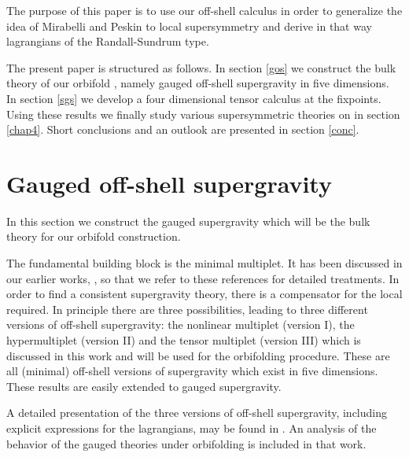 \documentclass[a4paper,12pt, twoside]{article}
\numberwithin{equation}{section}
\begin{document}
The purpose of this paper is to use our off-shell calculus in order to 
generalize the idea of Mirabelli and Peskin to local supersymmetry and 
derive in that way lagrangians of the Randall-Sundrum type.

\medskip

The present paper is structured as follows. In section \ref{gos} we 
construct the bulk theory of our orbifold \coordHE{}, namely 
gauged \coordHE{} off-shell supergravity in five dimensions.
In section \ref{sgs} we develop a four dimensional \coordHE{} tensor 
calculus at the fixpoints. Using these results we finally study various 
supersymmetric theories on \coordHE{} in section \ref{chap4}. Short 
conclusions and an outlook are presented in section \ref{conc}.

\section{Gauged off-shell supergravity\label{gos}}
In this section we construct the gauged supergravity which will be the 
bulk theory for our orbifold construction. 

The fundamental building block is the minimal multiplet. It has been 
discussed in our earlier works, \cite{Zucker:2000ej, Zucker:1999fn}, so 
that we refer to these references for detailed treatments. In order to 
find a consistent supergravity theory, there is a compensator for the 
local \coordHE{} required. In principle there are three 
possibilities, leading to three different versions of off-shell supergravity: the 
nonlinear multiplet \cite{Zucker:2000ej} (version I), the 
hypermultiplet \cite{diss} (version II) and the tensor multiplet (version III) which 
is discussed in this work and will be used for the orbifolding 
procedure. These are all (minimal) off-shell versions of \coordHE{} supergravity 
which exist in five dimensions. These results are easily extended to 
gauged supergravity. 

A detailed presentation of the three versions of off-shell 
supergravity, including explicit expressions for the lagrangians, may be found in 
\cite{diss}. An analysis of the behavior of the gauged theories under 
\coordHE{} orbifolding is included in that work. 
\end{document}

